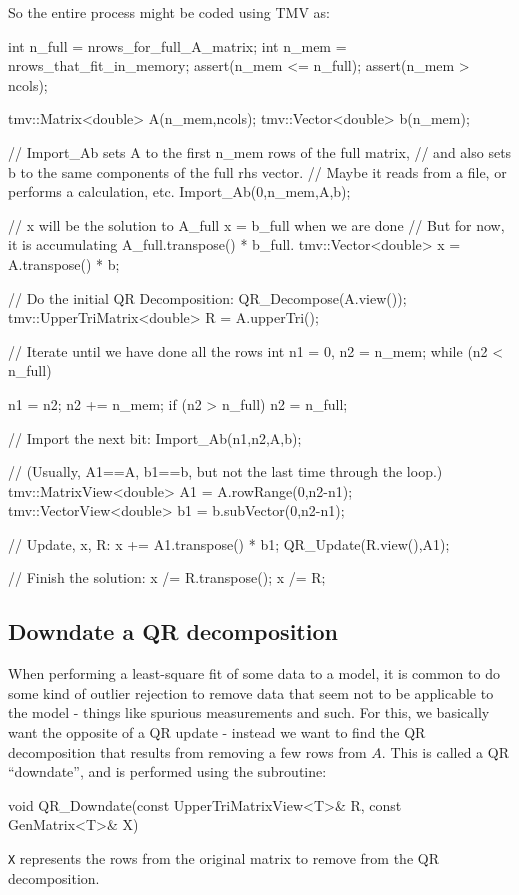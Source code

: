 \documentclass[twoside,letterpaper,11pt]{article}
\renewcommand{\tt}[1]{{\lstinline {#1}}}
\begin{document}
So the entire process might be coded using TMV as:
\begin{tmvcode}
int n_full = nrows_for_full_A_matrix;
int n_mem = nrows_that_fit_in_memory;
assert(n_mem <= n_full);
assert(n_mem > ncols);

tmv::Matrix<double> A(n_mem,ncols); 
tmv::Vector<double> b(n_mem);

// Import_Ab sets A to the first n_mem rows of the full matrix, 
// and also sets b to the same components of the full rhs vector.
// Maybe it reads from a file, or performs a calculation, etc.
Import_Ab(0,n_mem,A,b);

// x will be the solution to A_full x = b_full when we are done
// But for now, it is accumulating A_full.transpose() * b_full.
tmv::Vector<double> x = A.transpose() * b;

// Do the initial QR Decomposition:
QR_Decompose(A.view());
tmv::UpperTriMatrix<double> R = A.upperTri();

// Iterate until we have done all the rows
int n1 = 0, n2 = n_mem;
while (n2 < n_full) 
{
    n1 = n2; n2 += n_mem;
    if (n2 > n_full) n2 = n_full;

    // Import the next bit:
    Import_Ab(n1,n2,A,b);

    // (Usually, A1==A, b1==b, but not the last time through the loop.)
    tmv::MatrixView<double> A1 = A.rowRange(0,n2-n1);
    tmv::VectorView<double> b1 = b.subVector(0,n2-n1);

    // Update, x, R:
    x += A1.transpose() * b1;
    QR_Update(R.view(),A1);
}

// Finish the solution:
x /= R.transpose();
x /= R;
\end{tmvcode}

\subsection{Downdate a QR decomposition}
\label{QRDowndate}

When performing a least-square fit of some data to a model,
it is common to do some kind of outlier rejection to remove data that
seem not to be applicable to the model - things like spurious measurements
and such.
For this, we basically want the opposite of a QR update - instead we want to 
find the QR decomposition that results from
removing a few rows from $A$.  This is called a QR ``downdate'', and is performed
using the subroutine:
\begin{tmvcode}
void QR_Downdate(const UpperTriMatrixView<T>& R, const GenMatrix<T>& X)
\end{tmvcode}
\tt{X} represents the rows from the original matrix to remove from the 
QR decomposition.
\end{document}

